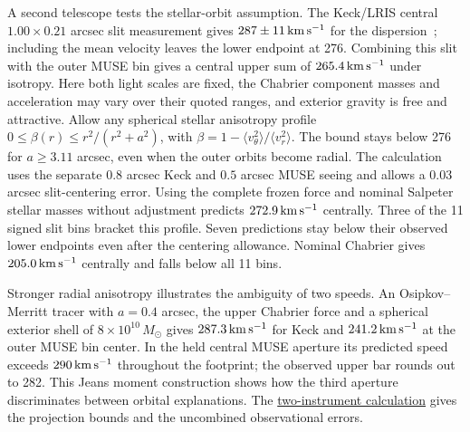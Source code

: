 \documentclass[11pt]{article}
\begin{document}
A second telescope tests the stellar-orbit assumption. The Keck/LRIS
central $1.00\times0.21$ arcsec slit measurement gives
$287\pm11\,{\rm km\,s^{-1}}$ for the dispersion~\cite{jackpot2012};
including the mean velocity leaves the lower endpoint at 276.
Combining this slit with the outer MUSE bin gives a central upper
sum of $265.4\,{\rm km\,s^{-1}}$ under isotropy. Here both light
scales are fixed, the Chabrier component masses and acceleration may
vary over their quoted ranges, and exterior gravity is free and
attractive. Allow any spherical stellar anisotropy profile
$0\le\beta(r)\le r^2/(r^2+a^2)$, with $\beta=1-\langle v_\theta^2\rangle/
\langle v_r^2\rangle$. The bound stays below 276 for $a\ge3.11$ arcsec,
even when the outer orbits become radial. The calculation uses the
separate $0.8$ arcsec Keck and $0.5$ arcsec MUSE seeing and allows
a $0.03$ arcsec slit-centering error. Using the complete frozen force
and nominal Salpeter stellar masses without adjustment predicts
$272.9\,{\rm km\,s^{-1}}$ centrally. Three of the 11 signed slit bins
bracket this profile. Seven predictions stay below their observed lower endpoints
even after the centering allowance. Nominal Chabrier gives
$205.0\,{\rm km\,s^{-1}}$ centrally and falls below all 11 bins.

Stronger radial anisotropy illustrates the ambiguity of two speeds.
An Osipkov--Merritt tracer with $a=0.4$ arcsec, the upper Chabrier
force and a spherical exterior shell of $8\times10^{10}\,M_\odot$
gives $287.3\,{\rm km\,s^{-1}}$ for Keck and $241.2\,{\rm km\,s^{-1}}$
at the outer MUSE bin center. In the held central MUSE aperture its
predicted speed exceeds $290\,{\rm km\,s^{-1}}$ throughout the footprint;
the observed upper bar rounds out to 282. This Jeans moment construction
shows how the third aperture discriminates between orbital explanations.
The \href{https://github.com/FloatingPragma/observer-patch-holography/tree/main/code/cosmology/rar_deep_regime/double_ring_pressure/resolved_kinematics/slit_anisotropy}{two-instrument calculation}
gives the projection bounds and the uncombined observational errors.
\end{document}
